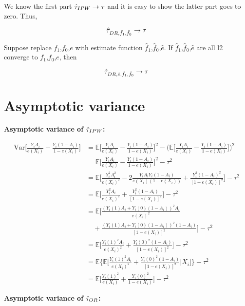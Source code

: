 \documentclass[
]{book}
\begin{document}
We know the first part \(\hat{\Large\tau}_{IPW} \rightarrow {\Large\tau}\) and it is easy to show the latter part goes to zero. Thus,

\[\hat{\Large\tau}_{DR,\hat{f}_1,\hat{f}_0} \rightarrow {\Large\tau}\]

Suppose replace \(f_1\),\(f_0\),\(e\) with estimate function \(\hat f_1\),\(\hat f_0\),\(\hat e\). If \(\hat f_1\),\(\hat f_0\),\(\hat e\) are all l2 converge to \(f_1\),\(f_0\),\(e\), then

\[\hat{\Large\tau}_{DR,\hat{e},\hat{f}_1,\hat{f}_0} \rightarrow {\Large\tau}\]

\hypertarget{asymptotic-variance}{%
\section{Asymptotic variance}\label{asymptotic-variance}}

\textbf{Asymptotic variance of \(\hat{\Large\tau}_{IPW}\):}

\begin{align*}
\text{Var} \bigg[\frac{Y_iA_i}{e(X_i)} - \frac{Y_i(1-A_i)}{1-e(X_i)}\bigg] &= \mathbb{E}\bigg[\frac{Y_iA_i}{e(X_i)} - \frac{Y_i(1-A_i)}{1-e(X_i)}\bigg]^2 - \bigg(\mathbb{E}\bigg[\frac{Y_iA_i}{e(X_i)} - \frac{Y_i(1-A_i)}{1-e(X_i)}\bigg]\bigg)^2\\
&= \mathbb{E}\bigg[\frac{Y_iA_i}{e(X_i)} - \frac{Y_i(1-A_i)}{1-e(X_i)}\bigg]^2 - \tau^2 \\
&= \mathbb{E}\bigg[ \frac{Y_i^2A_i^2}{e(X_i)^2} - 2\frac{Y_iA_iY_i(1-A_i)}{e(X_i)(1-e(X_i))}+ \frac{Y_i^2(1-A_i)^2}{[1-e(X_i)]^2}\bigg] - \tau^2 \\
&= \mathbb{E}\bigg[ \frac{Y_i^2A_i}{e(X_i)^2} + \frac{Y_i^2(1-A_i)}{[1-e(X_i)]^2}\bigg] - \tau^2 \\
&= \mathbb{E}\bigg[ \frac{(Y_{i}(1)A_i + Y_{i}(0)(1-A_i))^2A_i}{e(X_i)^2} \\
&\,\,\,\,\,\,+ \frac{(Y_{i}(1)A_i + Y_{i}(0)(1-A_i))^2(1-A_i)}{[1-e(X_i)]^2}\bigg] - \tau^2 \\
&= \mathbb{E}\bigg[ \frac{Y_i(1)^2A_i}{e(X_i)^2} + \frac{Y_i(0)^2(1-A_i)}{[1-e(X_i)]^2}\bigg] - \tau^2 \\
&= \mathbb{E}\bigg\{\mathbb{E}\bigg[ \frac{Y_i(1)^2A_i}{e(X_i)^2} + \frac{Y_i(0)^2(1-A_i)}{[1-e(X_i)]^2}| X_i\bigg] \bigg\}- \tau^2 \\
&= \mathbb{E}\bigg[ \frac{Y_i(1)^2}{e(X_i)} + \frac{Y_i(0)^2}{1-e(X_i)}\bigg] - \tau^2
\end{align*}

\textbf{Asymptotic variance of \(\hat{\Large\tau}_{OR}\):}
\end{document}
